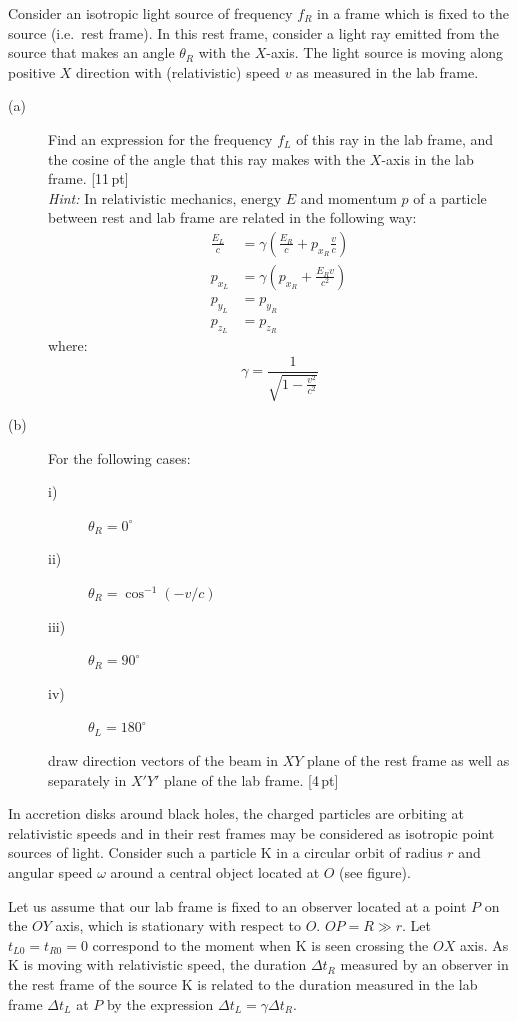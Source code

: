 Consider an isotropic light source of frequency $f_R$ in a frame which is
fixed to the source (i.e.\ rest frame). In this rest frame, consider a light
ray emitted from the source that makes an angle $\theta_R$ with the $X$-axis.
The light source is moving along positive $X$ direction with (relativistic)
speed $v$ as measured in the lab frame.

\begin{description}
\item[(a)] Find an expression for the frequency $f_L$ of this ray in the lab
  frame, and the cosine of the angle that this ray makes with the $X$-axis in
  the lab frame. \hfill[11\,pt]\\
  \textit{Hint:} In relativistic mechanics, energy $E$ and momentum $p$ of a
  particle between rest and lab frame are related in the following way:
  \begin{align*}
    \frac{E_L}{c} &= \gamma\left(\frac{E_R}{c} + p_{x_R}\frac{v}{c}\right)\\
    p_{x_L} &= \gamma\left(p_{x_R} + \frac{E_R v}{c^2}\right)\\
    p_{y_L} &= p_{y_R}\\
    p_{z_L} &= p_{z_R}
  \end{align*}
  where:
  \[ \gamma = \frac{1}{\sqrt{1 - \frac{v^2}{c^2}}} \]
\item[(b)] For the following cases:
  \begin{description}
  \item[i)] $\theta_R = 0^\circ$
  \item[ii)] $\theta_R = \cos^{-1}(-v/c)$
  \item[iii)] $\theta_R = 90^\circ$
  \item[iv)] $\theta_L = 180^\circ$
  \end{description}
  draw direction vectors of the beam in $XY$ plane of the rest frame as well
  as separately in $X'Y'$ plane of the lab frame. \hfill[4\,pt]
\end{description}

In accretion disks around black holes, the charged particles are orbiting at
relativistic speeds and in their rest frames may be considered as isotropic
point sources of light. Consider such a particle K in a circular orbit of
radius $r$ and angular speed $\omega$ around a central object located at $O$
(see figure).


Let us assume that our lab frame is fixed to an observer located at a point
$P$ on the $OY$ axis, which is stationary with respect to $O$.
$OP = R \gg r$. Let $t_{L0} = t_{R0} = 0$ correspond to the moment when K is
seen crossing the $OX$ axis. As K is moving with relativistic speed, the
duration $\Delta t_R$ measured by an observer in the rest frame of the source
K is related to the duration measured in the lab frame $\Delta t_L$ at $P$ by
the expression $\Delta t_L = \gamma\Delta t_R$.

